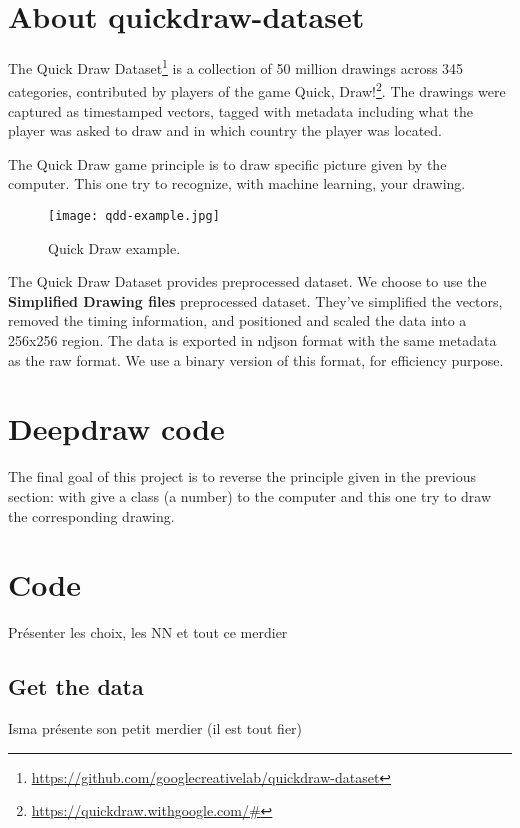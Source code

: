 \documentclass[
  10pt, 
  a4paper,
  oneside, 
  headinclude, 
  footinclude, 
  BCOR5mm, 
]{scrartcl}
\begin{document}
\section{About quickdraw-dataset}

The Quick Draw Dataset\footnote{\url{https://github.com/googlecreativelab/quickdraw-dataset}} is a collection of 50 million drawings across 345 categories, contributed by players of the game Quick, Draw!\footnote{\url{https://quickdraw.withgoogle.com/\#}}. The drawings were captured as timestamped vectors, tagged with metadata including what the player was asked to draw and in which country the player was located.

The Quick Draw game principle is to draw specific picture given by the computer. This one try to recognize, with machine learning, your drawing.

\begin{figure}[h]
	\center
	\texttt{[image: qdd-example.jpg]}
	\caption{Quick Draw example.}
	\label{promo-asylamba}
\end{figure}

The Quick Draw Dataset provides preprocessed dataset. We choose to use the \textbf{Simplified Drawing files} preprocessed dataset. They've simplified the vectors, removed the timing information, and positioned and scaled the data into a 256x256 region. The data is exported in ndjson format with the same metadata as the raw format. We use a binary version of this format, for efficiency purpose.


\section{Deepdraw code}

The final goal of this project is to reverse the principle given in the previous section: with give a class (a number) to the computer and this one try to draw the corresponding drawing.


\section{Code}

Présenter les choix, les NN et tout ce merdier

\subsection{Get the data}

Isma présente son petit merdier (il est tout fier)
\end{document}
